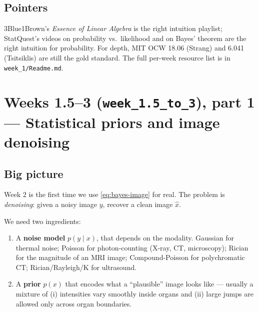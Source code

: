 \documentclass[11pt,a4paper]{article}
\begin{document}

\subsection{Pointers}

3Blue1Brown's \emph{Essence of Linear Algebra} is the right intuition
playlist; StatQuest's videos on probability vs.\ likelihood and on
Bayes' theorem are the right intuition for probability. For depth, MIT
OCW 18.06 (Strang) and 6.041 (Tsitsiklis) are still the gold standard.
The full per-week resource list is in \texttt{week\_1/Readme.md}.

\section{Weeks 1.5--3 (\texttt{week\_1.5\_to\_3}), part 1 --- Statistical priors and image denoising}

\subsection{Big picture}

Week 2 is the first time we use \eqref{eq:bayes-image} for real. The
problem is \emph{denoising}: given a noisy image $y$, recover a
clean image $\hat x$.

We need two ingredients:
\begin{enumerate}[nosep, leftmargin=*]
  \item A \textbf{noise model} $p(y \mid x)$, that depends on the
        modality. Gaussian for thermal noise; Poisson for
        photon-counting (X-ray, CT, microscopy); Rician for the
        magnitude of an MRI image; Compound-Poisson for
        polychromatic CT; Rician/Rayleigh/K for ultrasound.
  \item A \textbf{prior} $p(x)$ that encodes what a ``plausible''
        image looks like --- usually a mixture of (i) intensities vary
        smoothly inside organs and (ii) large jumps are allowed only
        across organ boundaries.
\end{enumerate}
\end{document}
